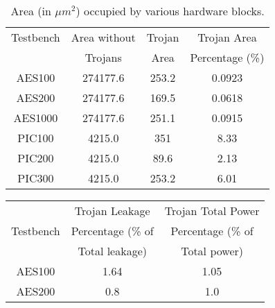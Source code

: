 \documentclass{beamer}
\begin{document}
\begin{columns}
\begin{column}[T]{0.33\textwidth}
                \begin{table}[h]
                    \begin{center}
                        \begin{tabular}{c c c c}
                            Testbench & Area without & Trojan     & Trojan Area      \\
                                      & Trojans      & Area       & Percentage (\%)  \\
                        \arrayrulecolor{black}\hline
                            AES100    & 274177.6     & 253.2      & 0.0923 \\
                            AES200    & 274177.6     & 169.5      & 0.0618 \\
                            AES1000   & 274177.6     & 251.1      & 0.0915 \\
                            PIC100 	  & 4215.0 & 351 & 8.33 \\
                            PIC200    & 4215.0 & 89.6 & 2.13 \\
                            PIC300    & 4215.0 & 253.2 & 6.01 \\
                        \end{tabular}
                        \caption{Area (in $\mu m^2$) occupied by various hardware blocks.}
                        \label{tab:area}
                    \end{center}
                \end{table}
                \begin{table}[h]
                            \begin{tabular}{c c c}
                                          & Trojan Leakage        & Trojan Total Power  \\
                                Testbench & Percentage (\% of     & Percentage (\% of \\
                                          & Total leakage)        & Total power) \\
                        \arrayrulecolor{black}\hline
                                AES100    & 1.64           & 1.05 \\
                                AES200    & 0.8            & 1.0 \\

\end{tabular}
\end{table}
\end{column}
\end{columns}
\end{document}
